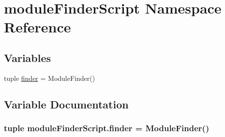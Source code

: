 \hypertarget{namespacemodule_finder_script}{}\section{module\+Finder\+Script Namespace Reference}
\label{namespacemodule_finder_script}
\subsection*{Variables}
\begin{DoxyCompactItemize}
\item 
tuple \hyperlink{namespacemodule_finder_script_a863109df394506ff3b6f1c60c6fcc0a1}{finder} = Module\+Finder()
\end{DoxyCompactItemize}


\subsection{Variable Documentation}
\hypertarget{namespacemodule_finder_script_a863109df394506ff3b6f1c60c6fcc0a1}{}
\subsubsection[{finder}]{\setlength{\rightskip}{0pt plus 5cm}tuple module\+Finder\+Script.\+finder = Module\+Finder()}\label{namespacemodule_finder_script_a863109df394506ff3b6f1c60c6fcc0a1}
